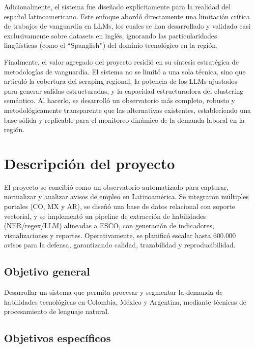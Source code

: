 Adicionalmente, el sistema fue diseñado explícitamente para la realidad del español latinoamericano. Este enfoque abordó directamente una limitación crítica de trabajos de vanguardia en LLMs, los cuales se han desarrollado y validado casi exclusivamente sobre datasets en inglés, ignorando las particularidades lingüísticas (como el ``Spanglish'') del dominio tecnológico en la región.

Finalmente, el valor agregado del proyecto residió en su síntesis estratégica de metodologías de vanguardia. El sistema no se limitó a una sola técnica, sino que articuló la cobertura del scraping regional, la potencia de los LLMs ajustados para generar salidas estructuradas, y la capacidad estructuradora del clustering semántico. Al hacerlo, se desarrolló un observatorio más completo, robusto y metodológicamente transparente que las alternativas existentes, estableciendo una base sólida y replicable para el monitoreo dinámico de la demanda laboral en la región.

\section{Descripción del proyecto}

El proyecto se concibió como un observatorio automatizado para capturar, normalizar y analizar avisos de empleo en Latinoamérica. Se integraron múltiples portales (CO, MX y AR), se diseñó una base de datos relacional con soporte vectorial, y se implementó un pipeline de extracción de habilidades (NER/regex/LLM) alineadas a ESCO, con generación de indicadores, visualizaciones y reportes. Operativamente, se planificó escalar hasta 600.000 avisos para la defensa, garantizando calidad, trazabilidad y reproducibilidad.

\subsection{Objetivo general}

Desarrollar un sistema que permita procesar y segmentar la demanda de habilidades tecnológicas en Colombia, México y Argentina, mediante técnicas de procesamiento de lenguaje natural.

\subsection{Objetivos específicos}

